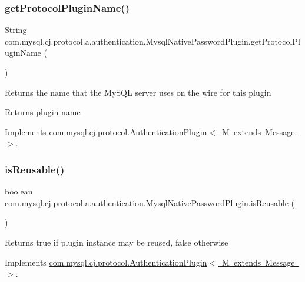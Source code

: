 \subsubsection{\texorpdfstring{get\+Protocol\+Plugin\+Name()}{getProtocolPluginName()}}
{\footnotesize\ttfamily String com.\+mysql.\+cj.\+protocol.\+a.\+authentication.\+Mysql\+Native\+Password\+Plugin.\+get\+Protocol\+Plugin\+Name (\begin{DoxyParamCaption}{ }\end{DoxyParamCaption})}

Returns the name that the My\+S\+QL server uses on the wire for this plugin

\begin{DoxyReturn}{Returns}
plugin name 
\end{DoxyReturn}


Implements \mbox{\hyperlink{interfacecom_1_1mysql_1_1cj_1_1protocol_1_1_authentication_plugin_ab428486b799598c36f4506c95ff5b94b}{com.\+mysql.\+cj.\+protocol.\+Authentication\+Plugin$<$ M extends Message $>$}}.

\mbox{\label{classcom_1_1mysql_1_1cj_1_1protocol_1_1a_1_1authentication_1_1_mysql_native_password_plugin_a70160aeab582b3ddfbe93a80b46d2a4e}} 
\subsubsection{\texorpdfstring{is\+Reusable()}{isReusable()}}
{\footnotesize\ttfamily boolean com.\+mysql.\+cj.\+protocol.\+a.\+authentication.\+Mysql\+Native\+Password\+Plugin.\+is\+Reusable (\begin{DoxyParamCaption}{ }\end{DoxyParamCaption})}

\begin{DoxyReturn}{Returns}
true if plugin instance may be reused, false otherwise 
\end{DoxyReturn}


Implements \mbox{\hyperlink{interfacecom_1_1mysql_1_1cj_1_1protocol_1_1_authentication_plugin_afff2eda7e67e6847d2401461100e2c69}{com.\+mysql.\+cj.\+protocol.\+Authentication\+Plugin$<$ M extends Message $>$}}.

